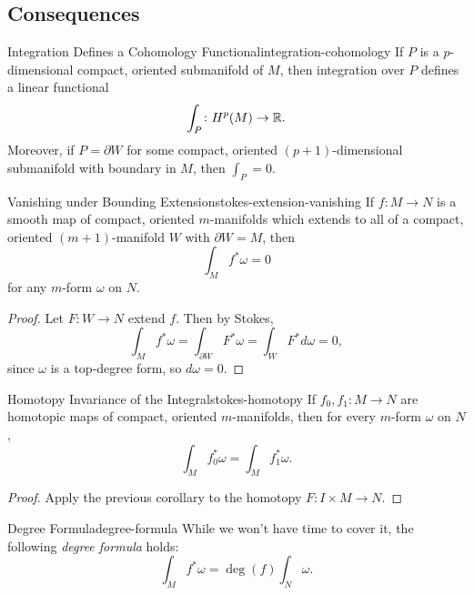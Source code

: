 \subsection{Consequences}

\begin{corollary}{Integration Defines a Cohomology Functional}{integration-cohomology}
    If $P$ is a $p$-dimensional compact, oriented submanifold of $M$, then integration over $P$ defines a linear functional
    \[
        \int_P \colon H^p(M) \to \mathbb{R}.
    \]
    Moreover, if $P = \partial W$ for some compact, oriented $(p+1)$-dimensional submanifold with boundary in $M$, then $\int_P = 0$.
\end{corollary}

\begin{corollary}{Vanishing under Bounding Extension}{stokes-extension-vanishing}
    If $f \colon M \to N$ is a smooth map of compact, oriented $m$-manifolds which extends to all of a compact, oriented $(m+1)$-manifold $W$ with $\partial W = M$, then
    \[
        \int_M f^*\omega = 0
    \]
    for any $m$-form $\omega$ on $N$.
\end{corollary}

\begin{proof}
    Let $F \colon W \to N$ extend $f$. Then by Stokes,
    \[
        \int_M f^*\omega = \int_{\partial W} F^*\omega = \int_W F^* d\omega = 0,
    \]
    since $\omega$ is a top-degree form, so $d\omega = 0$.
\end{proof}

\begin{corollary}{Homotopy Invariance of the Integral}{stokes-homotopy}
    If $f_0, f_1 \colon M \to N$ are homotopic maps of compact, oriented $m$-manifolds, then for every $m$-form $\omega$ on $N$,
    \[
        \int_M f_0^*\omega = \int_M f_1^*\omega.
    \]
\end{corollary}

\begin{proof}
    Apply the previous corollary to the homotopy $F \colon I \times M \to N$.
\end{proof}

\begin{remark}{Degree Formula}{degree-formula}
    While we won't have time to cover it, the following \emph{degree formula} holds:
    \[
        \int_M f^*\omega = \deg(f) \int_N \omega.
    \]
\end{remark}
